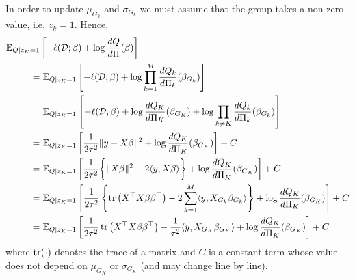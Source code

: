 \documentclass[12pt]{article}
\begin{document}
In order to update $\mu_{G_k}$ and $\sigma_{G_k}$ we must assume that the group takes a non-zero value, i.e. $z_k =1$. Hence, %
{\allowdisplaybreaks
\begin{align}
\mathbb{E}_{Q  | z_K = 1} & \left[ 
    - \ell(\mathcal{D}; \beta) + \log \frac{dQ}{d\Pi}(\beta) 
\right]  \nonumber \\
= &\
    \mathbb{E}_{Q | z_K = 1} \left[ 
	- \ell(\mathcal{D}; \beta) + \log \prod_{k=1}^M \frac{dQ_k}{d\Pi_k}(\beta_{G_k})
    \right] \nonumber \\
= &\
    \mathbb{E}_{Q | z_K = 1} \left[ 
	- \ell(\mathcal{D}; \beta) 
	+ \log \frac{dQ_K}{d\Pi_K}(\beta_{G_K})
	+ \log \prod_{k \neq K} \frac{dQ_k}{d\Pi_k}(\beta_{G_k})
    \right] \nonumber \\
= &\
    \mathbb{E}_{Q | z_K = 1} \left[ 
	\frac{1}{2\tau^2} \| y - X \beta \|^2
	+ \log \frac{dQ_K}{d\Pi_K}(\beta_{G_K})
    \right] + C \nonumber \\
= &\
    \mathbb{E}_{Q | z_K = 1} \left[ 
	\frac{1}{2\tau^2} \bigg\{ 
	    \| X \beta \|^2 - 2 \langle y, X\beta \rangle 
	\bigg\}
	+ \log \frac{dQ_K}{d\Pi_K}(\beta_{G_K})
    \right] + C \nonumber \\
= &\
    \mathbb{E}_{Q | z_K = 1} \left[ 
	\frac{1}{2\tau^2} \left\{ 
	    \operatorname{tr} \left( X^\top X \beta \beta^\top \right) 
	    - 2 \sum_{k=1}^M \langle y, X_{G_k} \beta_{G_k} \rangle 
	\right\}
	+ \log \frac{dQ_K}{d\Pi_K}(\beta_{G_K})
    \right] + C \nonumber \\
= &\
    \mathbb{E}_{Q | z_K = 1} \left[ 
	\frac{1}{2\tau^2} \operatorname{tr} \left( X^\top X \beta \beta^\top \right) 
	- \frac{1}{\tau^2} \langle y, X_{G_K} \beta_{G_K} \rangle 
	+ \log \frac{dQ_K}{d\Pi_K}(\beta_{G_K})
    \right] + C \label{eq:mu_sigma_1}
\end{align}
} %
where $\operatorname{tr}(\cdot)$ denotes the trace of a matrix and $C$ is a constant term whose value does not depend on $\mu_{G_K}$ or $\sigma_{G_K}$ (and may change line by line).
\end{document}
